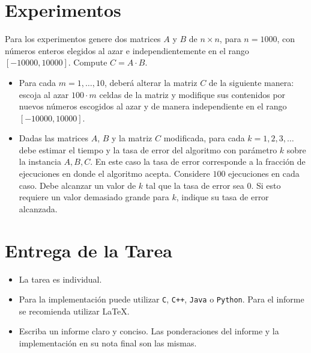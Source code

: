 \documentclass[dcc,uchile]{fcfmcourse}
\begin{document}
\section{Experimentos}
Para los experimentos genere dos matrices $A$ y $B$ de $n\times n$, para $n=1000$, con números enteros elegidos al azar e independientemente en el rango $[-10000, 10000]$. Compute $C = A\cdot B$.
\begin{itemize}
    \item Para cada $m= 1, \ldots, 10$, deberá alterar la matriz $C$ de la siguiente manera: escoja al azar $100\cdot m$ celdas de la matriz y modifique sus contenidos por nuevos números escogidos al azar y de manera independiente en el rango $[-10000, 10000]$.
    \item Dadas las matrices $A$, $B$ y la matriz $C$ modificada, para cada $k = 1, 2, 3 ,\ldots$ debe estimar el tiempo y la tasa de error del algoritmo con parámetro $k$ sobre la instancia $A,B,C$. En este caso la tasa de error corresponde a la fracción de ejecuciones en donde el algoritmo acepta. Considere $100$ ejecuciones en cada caso. Debe alcanzar un valor de $k$ tal que la tasa de error sea $0$. Si esto requiere un valor demasiado grande para $k$, indique su tasa de error alcanzada.
\end{itemize}
\section{Entrega de la Tarea}
\begin{itemize}
    \item La tarea es individual.
    \item Para la implementación puede utilizar \texttt{C}, \texttt{C++}, \texttt{Java} o \texttt{Python}. Para el informe se recomienda utilizar \LaTeX.
    \item Escriba un informe claro y conciso. Las ponderaciones del informe y la implementación en su nota final son las mismas.
\end{itemize}
\end{document}
